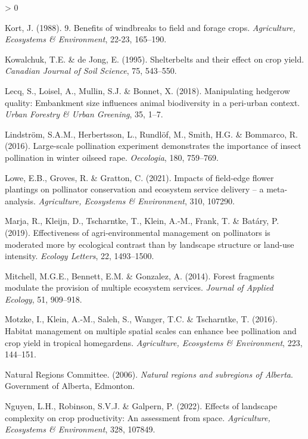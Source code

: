\documentclass[]{elsarticle} %
\newlength{\cslhangindent}
\newenvironment{CSLReferences}[2] %
 {%
  \setlength{\parindent}{0pt}
  \ifodd #1 \everypar{\setlength{\hangindent}{\cslhangindent}}\ignorespaces\fi
  \ifnum #2 > 0
  \setlength{\parskip}{#2\baselineskip}
  \fi
 }%
 {}
\begin{document}
\begin{CSLReferences}{1}{0}
\leavevmode\hypertarget{ref-kort1988}{}%
Kort, J. (1988). 9. Benefits of windbreaks to field and forage crops. \emph{Agriculture, Ecosystems {\&} Environment}, 22-23, 165--190.

\leavevmode\hypertarget{ref-kowalchuk1995}{}%
Kowalchuk, T.E. \& de Jong, E. (1995). Shelterbelts and their effect on crop yield. \emph{Canadian Journal of Soil Science}, 75, 543--550.

\leavevmode\hypertarget{ref-lecq2018}{}%
Lecq, S., Loisel, A., Mullin, S.J. \& Bonnet, X. (2018). Manipulating hedgerow quality: Embankment size influences animal biodiversity in a peri-urban context. \emph{Urban Forestry {\&} Urban Greening}, 35, 1--7.

\leavevmode\hypertarget{ref-lindstrom2016}{}%
Lindström, S.A.M., Herbertsson, L., Rundlöf, M., Smith, H.G. \& Bommarco, R. (2016). Large-scale pollination experiment demonstrates the importance of insect pollination in winter oilseed rape. \emph{Oecologia}, 180, 759--769.

\leavevmode\hypertarget{ref-lowe2021}{}%
Lowe, E.B., Groves, R. \& Gratton, C. (2021). Impacts of field-edge flower plantings on pollinator conservation and ecosystem service delivery -- a meta-analysis. \emph{Agriculture, Ecosystems {\&} Environment}, 310, 107290.

\leavevmode\hypertarget{ref-marja2019}{}%
Marja, R., Kleijn, D., Tscharntke, T., Klein, A.-M., Frank, T. \& Batáry, P. (2019). Effectiveness of agri-environmental management on pollinators is moderated more by ecological contrast than by landscape structure or land-use intensity. \emph{Ecology Letters}, 22, 1493--1500.

\leavevmode\hypertarget{ref-mitchell2014}{}%
Mitchell, M.G.E., Bennett, E.M. \& Gonzalez, A. (2014). Forest fragments modulate the provision of multiple ecosystem services. \emph{Journal of Applied Ecology}, 51, 909--918.

\leavevmode\hypertarget{ref-motzke2016}{}%
Motzke, I., Klein, A.-M., Saleh, S., Wanger, T.C. \& Tscharntke, T. (2016). Habitat management on multiple spatial scales can enhance bee pollination and crop yield in tropical homegardens. \emph{Agriculture, Ecosystems \& Environment}, 223, 144--151.

\leavevmode\hypertarget{ref-ABRegions2006}{}%
Natural Regions Committee. (2006). \emph{Natural regions and subregions of {Alberta}}. Government of Alberta, Edmonton.

\leavevmode\hypertarget{ref-nguyen2022}{}%
Nguyen, L.H., Robinson, S.V.J. \& Galpern, P. (2022). Effects of landscape complexity on crop productivity: An assessment from space. \emph{Agriculture, Ecosystems \& Environment}, 328, 107849.


\end{CSLReferences}
\end{document}
